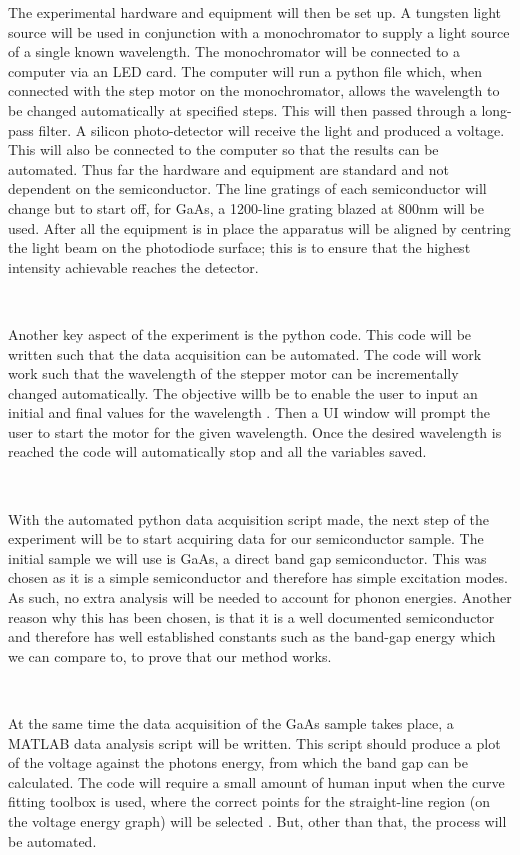 \documentclass{article}
\begin{document}


The experimental hardware and equipment will then be set up. A tungsten light source will be used in conjunction with a monochromator to supply a light source of a single known wavelength. The monochromator will be connected to a computer via an LED card. The computer will run a python file which, when connected with the step motor on the monochromator, allows the wavelength to be changed automatically at specified steps. This will then passed through a long-pass filter. A silicon photo-detector will receive the light and produced a voltage. This will also be connected to the computer so that the results can be automated. Thus far the hardware and equipment are standard and not dependent on the semiconductor. The line gratings of each semiconductor will change but to start off, for GaAs, a 1200-line grating blazed at 800nm will be used. After all the equipment is in place the apparatus will be aligned by centring the light beam on the photodiode surface; this is to ensure that the highest intensity achievable reaches the detector.

\

Another key aspect of the experiment is the python code. This code will be written such that the data acquisition can be automated. The code will work work such that the wavelength of the stepper motor can be incrementally changed automatically. The objective willb be to enable the user to input an initial and final values for the wavelength . Then a UI window will prompt the user to start the motor for the given wavelength. Once the desired wavelength is reached the code will automatically stop and all the variables saved.

\

With the automated python data acquisition script made, the next step of the experiment will be to start acquiring data for our semiconductor sample. The initial sample we will use is GaAs, a direct band gap semiconductor. This was chosen as it is a simple semiconductor and therefore has simple excitation modes. As such, no extra analysis will be needed to account for phonon energies. Another reason why this has been chosen, is that it is a well documented semiconductor and therefore has well established constants such as the band-gap energy which we can compare to, to prove that our method works. 

\

At the same time the data acquisition of the GaAs sample takes place, a MATLAB data analysis script will be written. This script should produce a plot of the voltage against the photons energy, from which the band gap can be calculated. The code will require a small amount of human input when the curve fitting toolbox is used, where the correct points for the straight-line region (on the voltage energy graph) will be selected . But, other than that, the process will be automated.  
\end{document}

